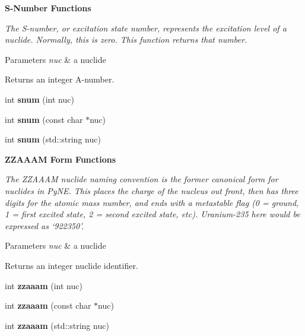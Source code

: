 \begin{Indent}\textbf{ S-\/\+Number Functions}\par
{\em The S-\/number, or excitation state number, represents the excitation level of a nuclide. Normally, this is zero. This function returns that number. 
\begin{DoxyParams}{Parameters}
{\em nuc} & a nuclide \\
\hline
\end{DoxyParams}
\begin{DoxyReturn}{Returns}
an integer A-\/number. 
\end{DoxyReturn}
}\begin{DoxyCompactItemize}
\item 
\mbox{\label{namespacepyne_1_1nucname_ad48fe72b30c8cdcc16156f4a4991af6b}} 
int {\bfseries snum} (int nuc)
\item 
\mbox{\label{namespacepyne_1_1nucname_a49f66e27e2a54300ad0f441ce4644235}} 
int {\bfseries snum} (const char $\ast$nuc)
\item 
\mbox{\label{namespacepyne_1_1nucname_a561dc9f333b1f890793caa4d7f6eb46b}} 
int {\bfseries snum} (std\+::string nuc)
\end{DoxyCompactItemize}
\end{Indent}
\begin{Indent}\textbf{ Z\+Z\+A\+A\+AM Form Functions}\par
{\em The Z\+Z\+A\+A\+AM nuclide naming convention is the former canonical form for nuclides in Py\+NE. This places the charge of the nucleus out front, then has three digits for the atomic mass number, and ends with a metastable flag (0 = ground, 1 = first excited state, 2 = second excited state, etc). Uranium-\/235 here would be expressed as ‘922350’. 
\begin{DoxyParams}{Parameters}
{\em nuc} & a nuclide \\
\hline
\end{DoxyParams}
\begin{DoxyReturn}{Returns}
an integer nuclide identifier. 
\end{DoxyReturn}
}\begin{DoxyCompactItemize}
\item 
\mbox{\label{namespacepyne_1_1nucname_ac28bf4202f94c1902bdcb2f0caf314e3}} 
int {\bfseries zzaaam} (int nuc)
\item 
\mbox{\label{namespacepyne_1_1nucname_afdb6c13f3fd672eb80d2551752509b1b}} 
int {\bfseries zzaaam} (const char $\ast$nuc)
\item 
\mbox{\label{namespacepyne_1_1nucname_aff543a0a9df5e199902780b49d4e82f6}} 
int {\bfseries zzaaam} (std\+::string nuc)
\end{DoxyCompactItemize}
\end{Indent}
